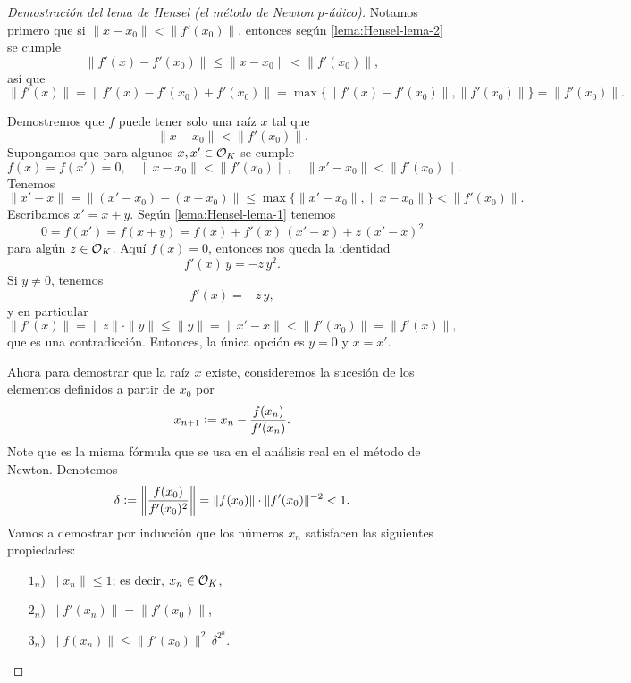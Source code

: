 \documentclass{article}
\numberwithin{equation}{section}
\theoremstyle{definition}
\begin{document}
\begin{proof}[Demostración del lema de Hensel (el método de Newton $p$-ádico)]
  Notamos primero que si $\|x-x_0\| < \|f' (x_0)\|$, entonces según
  \ref{lema:Hensel-lema-2} se cumple
  $$\|f' (x) - f' (x_0)\| \le \|x - x_0\| < \|f' (x_0)\|,$$
  así que
  \[ \|f' (x)\| =
     \|f' (x) - f' (x_0) + f' (x_0)\| =
     \max \{ \|f' (x) - f' (x_0)\|, \|f' (x_0)\| \} = \|f' (x_0)\|. \]

  Demostremos que $f$ puede tener solo una raíz $x$ tal que
  $$\|x-x_0\| < \|f' (x_0)\|.$$
  Supongamos que para algunos $x, x' \in \mathcal{O}_K$ se cumple
  \[ f (x) = f (x') = 0, \quad
     \|x-x_0\| < \|f' (x_0)\|, \quad
     \|x'-x_0\| < \|f' (x_0)\|. \]
  Tenemos
  \[ \|x' - x\| = \|(x' - x_0) - (x - x_0)\| \le
     \max \{ \|x' - x_0\|, \|x - x_0\| \} < \|f' (x_0)\|. \]
  Escribamos $x' = x + y$. Según \ref{lema:Hensel-lema-1} tenemos
  $$0 = f (x') = f (x + y) = f (x) + f' (x)\,(x'-x) + z\,(x' - x)^2$$
  para algún $z \in \mathcal{O}_K$. Aquí $f (x) = 0$, entonces nos queda la identidad
  $$f' (x)\,y = -z\,y^2.$$
  Si $y \ne 0$, tenemos
  $$f' (x) = -z\,y,$$
  y en particular
  \[ \|f' (x)\| = \|z\|\cdot \|y\| \le \|y\| =
     \|x' - x\| < \|f' (x_0)\| = \|f' (x)\|, \]
  que es una contradicción. Entonces, la única opción es $y = 0$ y $x = x'$.

  \vspace{1em}

  Ahora para demostrar que la raíz $x$ existe, consideremos la sucesión de los
  elementos definidos a partir de $x_0$ por
  $$x_{n+1} \mathrel{\mathop:}= x_n - \frac{f (x_n)}{f' (x_n)}.$$
  Note que es la misma fórmula que se usa en el análisis real en el método de
  Newton. Denotemos
  \[ \delta \mathrel{\mathop:}= \left\|\frac{f (x_0)}{f' (x_0)^2}\right\| =
     \|f (x_0)\|\cdot \|f' (x_0)\|^{-2} < 1. \]
  Vamos a demostrar por inducción que los números $x_n$ satisfacen las
  siguientes propiedades:

  \begin{enumerate}
  \item[$1_n$)] $\|x_n\| \le 1$; es decir, $x_n \in \mathcal{O}_K$,
  \item[$2_n$)] $\|f' (x_n)\| = \|f' (x_0)\|$,
  \item[$3_n$)] $\|f (x_n)\| \le \|f' (x_0)\|^2 \, \delta^{2^n}$.
  \end{enumerate}

  \vspace{1em}


\end{proof}
\end{document}
